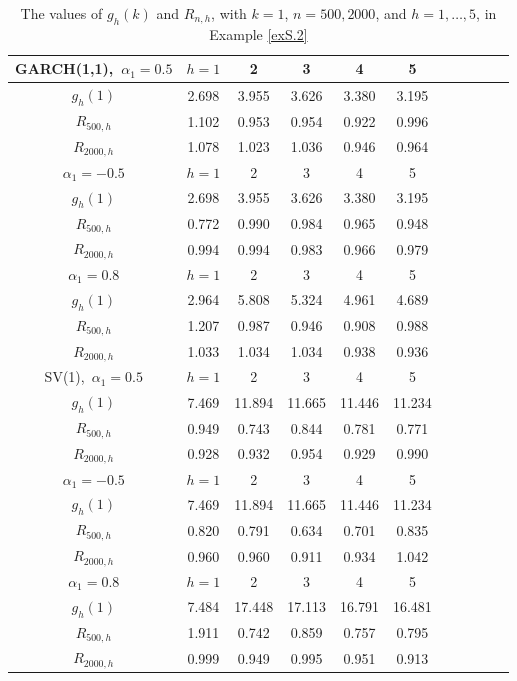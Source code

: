 \documentclass[ejsv2]{imsart}
\theoremstyle{plain}
\theoremstyle{definition}
\theoremstyle{remark}
\begin{document}
\begin{table}
\caption{The values of $g_{h}(k)$ and $R_{n,h}$, with $k=1$, $n=500, 2000$, and $h=1,\ldots, 5$, in Example \ref{exS.2}}
\label{tabS.2}
\centering
\begin{tabular}{ccccccccccc} \hline
    GARCH(1,1),\ $\alpha_1=0.5$& $h=1$ & 2 & 3 & 4 & 5 \\ \hline
     $g_{h}(1)$ &2.698 & 3.955 & 3.626 & 3.380 & 3.195 \\ \hline
   $R_{500,h}$ &1.102 & 0.953 & 0.954 & 0.922 & 0.996 \\
   $R_{2000,h}$ &1.078 & 1.023 & 1.036 & 0.946 & 0.964 \\ \hline 
      $\alpha_1=-0.5$& $h=1$ & 2 & 3 & 4 & 5 \\ \hline
    $g_{h}(1)$ &2.698 & 3.955 & 3.626 & 3.380 & 3.195 \\ \hline
   $R_{500,h}$ &0.772 & 0.990 & 0.984 & 0.965 & 0.948 \\
   $R_{2000,h}$ &0.994 & 0.994 & 0.983 & 0.966 & 0.979 \\ \hline 
        $\alpha_1=0.8$& $h=1$ & 2 & 3 & 4 & 5 \\ \hline
    $g_{h}(1)$ & 2.964 & 5.808 & 5.324 & 4.961 & 4.689 \\ \hline
   $R_{500,h}$ &1.207 & 0.987 & 0.946 & 0.908 & 0.988 \\
   $R_{2000,h}$ &1.033 & 1.034 & 1.034 & 0.938 & 0.936 \\ \hline \hline
   SV(1),\ $\alpha_1=0.5$ & $h=1$ & 2 & 3 & 4 & 5 \\ \hline
    $g_{h}(1)$ & 7.469 & 11.894 & 11.665 & 11.446 & 11.234 \\ \hline
   $R_{500,h}$ & 0.949 & 0.743 & 0.844 & 0.781 & 0.771 \\
   $R_{2000,h}$ & 0.928 & 0.932 & 0.954 & 0.929 & 0.990 \\ \hline
      $\alpha_1=-0.5$ & $h=1$ & 2 & 3 & 4 & 5 \\ \hline
    $g_{h}(1)$ & 7.469 & 11.894 & 11.665 & 11.446 & 11.234 \\ \hline
   $R_{500,h}$ & 0.820 & 0.791 & 0.634 & 0.701 & 0.835 \\
   $R_{2000,h}$ & 0.960 & 0.960 & 0.911 & 0.934 & 1.042 \\ \hline
      $\alpha_1=0.8$ & $h=1$ & 2 & 3 & 4 & 5 \\ \hline
    $g_{h}(1)$ & 7.484 & 17.448 & 17.113 & 16.791 & 16.481 \\ \hline
   $R_{500,h}$ & 1.911 & 0.742 & 0.859 & 0.757 & 0.795 \\
   $R_{2000,h}$ & 0.999 & 0.949 & 0.995 & 0.951 & 0.913 \\ \hline
  \end{tabular}
\end{table}
\end{document}
